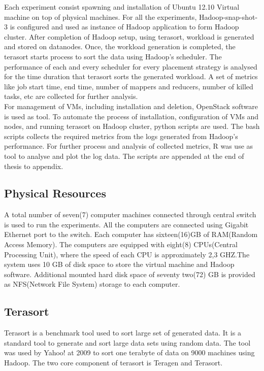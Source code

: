 Each experiment consist spawning and installation of Ubuntu 12.10 Virtual machine on top of physical machines. For all the experiments, Hadoop-snap-shot-3 is configured and used as instance of Hadoop application to form Hadoop cluster.  After completion of Hadoop setup, using terasort, workload is generated and stored on datanodes. Once, the workload generation is completed, the terasort starts process to sort the data using Hadoop's scheduler. The performance of each and every scheduler for every placement strategy is analysed for the time duration that terasort sorts the generated workload. A set of metrics like job start time, end time, number of mappers and reducers, number of killed tasks, etc are collected for further analysis.\\    

For management of VMs, including installation and deletion, OpenStack software is used as tool. To automate the process of installation, configuration of VMs and nodes, and running terasort on Hadoop cluster, python scripts are used. The bash scripts collects the required metrics from the logs generated from Hadoop's performance. For further process and analysis of collected metrics, R was use as tool to analyse and plot the log data. The scripts are appended at the end of thesis to appendix.  


\subsection{Physical Resources}
A total number of seven(7) computer machines connected through central switch is used to run the experiments. All the computers are connected using Gigabit Ethernet port to the switch. Each computer has sixteen(16)GB of RAM(Random Access Memory). The computers are equipped with eight(8) CPUs(Central Processing Unit), where the speed of each CPU is approximately 2,3 GHZ.The system uses 10 GB of disk space to store the virtual machine and Hadoop software. Additional mounted hard disk space of seventy two(72) GB is provided as NFS(Network File System) storage to each computer. 


\subsection{Terasort}
Terasort is a benchmark tool used to sort large set of generated data. It is a standard tool to generate and sort large data sets using random data. The tool was used by Yahoo!‌ at 2009 to sort one terabyte of data on 9000 machines using Hadoop. The two core component of terasort is Teragen and Terasort. 

